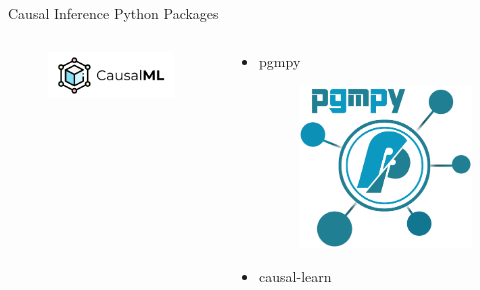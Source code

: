 \documentclass[aspectratio=169]{beamer}
\begin{document}
\begin{frame}{Causal Inference Python Packages}
\begin{columns}
\begin{column}[T]{0.5 \textwidth}
\begin{itemize}
					\begin{figure}
						\includegraphics[scale=0.3]{imgs/causalml.png}
					\end{figure}
			\end{itemize}

		\end{column}
		\vrule
		\begin{column}[T]{0.5 \textwidth}
			\begin{itemize}
				\item pgmpy
					\begin{figure}
						\includegraphics[scale=0.15]{imgs/pgmpy.png}
					\end{figure}
				\item causal-learn
					\begin{figure}

\end{figure}
\end{itemize}
\end{column}
\end{columns}
\end{frame}
\end{document}
